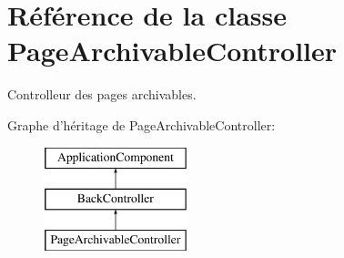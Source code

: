 \hypertarget{class_applications_1_1_backend_1_1_modules_1_1_page_archivable_1_1_page_archivable_controller}{\section{Référence de la classe Page\+Archivable\+Controller}
\label{class_applications_1_1_backend_1_1_modules_1_1_page_archivable_1_1_page_archivable_controller}
}


Controlleur des pages archivables.  


Graphe d'héritage de Page\+Archivable\+Controller\+:\begin{figure}[H]
\begin{center}
\leavevmode
\includegraphics[height=3.000000cm]{class_applications_1_1_backend_1_1_modules_1_1_page_archivable_1_1_page_archivable_controller}
\end{center}
\end{figure}
